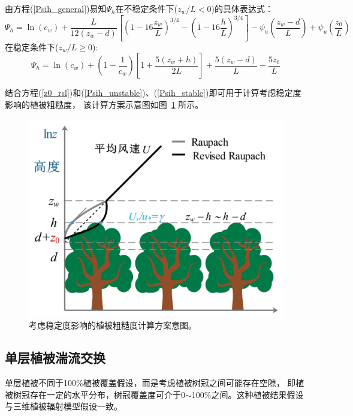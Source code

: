 由方程(\ref{Psih_general})易知$\Psi_{h}$在不稳定条件下($z_{w}/L < 0$)的具体表达式：
\begin{equation}\label{Psih_unstable}
\Psi_{h} = \ln \left(c_{w}\right) + \frac{L}{12\left(z_{w}-d\right)} \left[\left(1-16\frac{z_{w}}{L}\right)^{3/4} 
- \left(1-16\frac{h}{L}\right)^{3/4} \right] - \psi_u \left(\frac{z_{w}-d}{L} \right) + \psi_u \left(\frac{z_{0}}{L} \right)
\end{equation}
在稳定条件下($z_{w}/L \geq 0$):
\begin{equation}\label{Psih_stable}
\Psi_{h} = \ln \left(c_{w}\right) + \left(1-\frac{1}{c_{w}}\right) \left[1+\frac{5\left(z_{w}+h\right)}{2L}\right]
+ \frac{5\left(z_{w}-d\right)}{L} - \frac{5z_{0}}{L}
\end{equation}

结合方程(\ref{z0_rsl})和(\ref{Psih_unstable})、(\ref{Psih_stable})即可用于计算考虑稳定度影响的植被粗糙度，
该计算方案示意图如图~\ref{fig:修正Raupach粗糙度方案示意图} 所示。
{
\begin{figure}[]
\centering
\includegraphics[scale=0.7]{Figures/地表湍流交换过程/修正Raupach粗糙度方案示意图.jpg}
\caption{考虑稳定度影响的植被粗糙度计算方案意图。}
\label{fig:修正Raupach粗糙度方案示意图}
\end{figure}
}


\subsection{单层植被湍流交换}
单层植被不同于100\%植被覆盖假设，而是考虑植被树冠之间可能存在空隙，
即植被树冠存在一定的水平分布，树冠覆盖度可介于0$\sim$100\%之间。这种植被结果假设与三维植被辐射模型假设一致。


